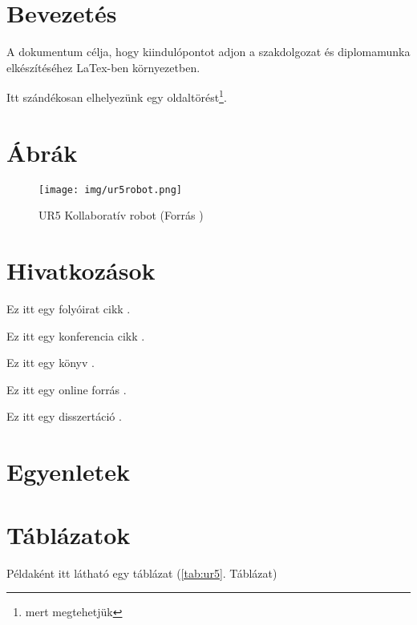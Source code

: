 \documentclass[12pt,a4paper]{article}
\author{Gipsz Jakab}
\begin{document}
	\maketitle
	\makeassigmentpage
	\makedeclaration
	\setcounter{page}{1} %
	\setalgorithmcounter %
	
	\maketoc
	
	
	
	\section{Bevezetés}
	A dokumentum célja, hogy kiindulópontot adjon a szakdolgozat és diplomamunka elkészítéséhez LaTex-ben környezetben. 
	
	Itt szándékosan elhelyezünk egy oldaltörést\footnote{mert megtehetjük}.
	\pagebreak
	
	\section{Ábrák}
	
	\begin{figure}[h!]
		\centering
		\texttt{[image: img/ur5robot.png]}
		\caption[UR5 Kollaboratív robot]{UR5 Kollaboratív robot (Forrás \cite{robotkar-kep})}
		\label{fig:robotik-bin-picking}
	\end{figure}
	
	\section{Hivatkozások}
	
	Ez itt egy folyóirat cikk \cite{journal-example}.
	
	Ez itt egy konferencia cikk \cite{conference-example}.
	
	Ez itt egy könyv \cite{book-example}.
	
	Ez itt egy online forrás \cite{online-example}.
	
	Ez itt egy disszertáció \cite{thesis-example}.
	
	\section{Egyenletek}
	
	\section{Táblázatok}
	Példaként itt látható egy táblázat (\ref{tab:ur5}. Táblázat)
	
\end{document}
